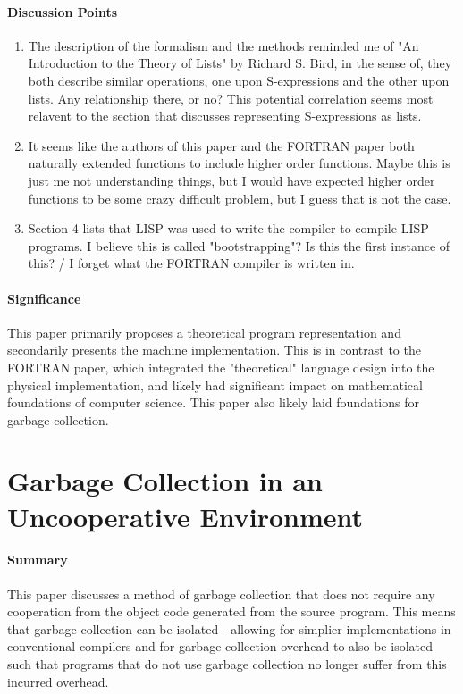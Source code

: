 \paragraph{\textbf{Discussion Points}}
\begin{enumerate}
    \item The description of the formalism and the methods reminded me of "An
    Introduction to the Theory of Lists" by Richard S. Bird, in the sense of,
    they both describe similar operations, one upon S-expressions and the other
    upon lists. Any relationship there, or no? This potential correlation seems
    most relavent to the section that discusses representing S-expressions as
    lists.
    \item It seems like the authors of this paper and the FORTRAN paper both
    naturally extended functions to include higher order functions. Maybe this
    is just me not understanding things, but I would have expected higher order
    functions to be some crazy difficult problem, but I guess that is not the
    case.
    \item Section 4 lists that LISP was used to write the compiler to compile
    LISP programs. I believe this is called "bootstrapping"? Is this the first
    instance of this? / I forget what the FORTRAN compiler is written in.
\end{enumerate}
\paragraph{\textbf{Significance}}
This paper primarily proposes a theoretical program representation and
secondarily presents the machine implementation. This is in contrast to the
FORTRAN paper, which integrated the "theoretical" language design into the
physical implementation, and likely had significant impact on mathematical
foundations of computer science. This paper also likely laid foundations for
garbage collection.


\section {Garbage Collection in an Uncooperative Environment
\cite{boehm1988garbage}}


\paragraph{\textbf{Summary}}
This paper discusses a method of garbage collection that does not require
any cooperation from the object code generated from the source program.
This means that garbage collection can be isolated - allowing for simplier
implementations in conventional compilers and for garbage collection
overhead to also be isolated such that programs that do not use garbage
collection no longer suffer from this incurred overhead.

